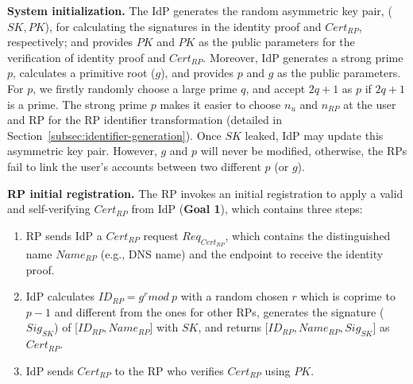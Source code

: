 \vspace{1mm}\noindent \textbf{System initialization.} The IdP generates the random asymmetric key pair, ($SK, PK$),
for calculating the signatures in the identity proof and $Cert_{RP}$, respectively;
and provides $PK$ and $PK$ as the public parameters for the verification of identity proof and $Cert_{RP}$.
Moreover, IdP generates a strong prime $p$, calculates  a primitive root ($g$), and provides $p$ and $g$ as the public parameters.
For $p$, we firstly randomly choose a large prime $q$, and accept  $2q+1$ as $p$ if $2q+1$ is a prime.
The strong prime $p$ makes it easier to choose $n_{u}$ and $n_{RP}$ at the user and RP for the RP identifier transformation (detailed in  Section~\ref{subsec:identifier-generation}). %
Once $SK$ leaked, IdP may update this asymmetric key pair.
However, $g$ and $p$ will never be modified, otherwise, the RPs fail to link the user's accounts between two different $p$ (or $g$).


\vspace{1mm}\noindent\textbf{RP initial registration.}
The RP invokes an initial registration to apply a valid and self-verifying $Cert_{RP}$ from IdP (\textbf{Goal 1}),
 which contains three steps:

\begin{enumerate}
\item RP sends IdP a $Cert_{RP}$ request $Req_{Cert_{RP}}$, which contains the distinguished name $Name_{RP}$ (e.g., DNS name) and the endpoint to receive the identity proof.
\item IdP calculates $ID_{RP} = g^r mod \ p$ with a random chosen $r$ which is coprime to $p-1$ and different from the ones for other RPs,  generates the signature ($Sig_{SK}$) of [$ID_{RP}, Name_{RP}$] with $SK$, and returns [$ID_{RP}, Name_{RP}, Sig_{SK}$] as $Cert_{RP}$.
\item IdP sends $Cert_{RP}$ to the RP who verifies $Cert_{RP}$ using $PK$.
\end{enumerate}



